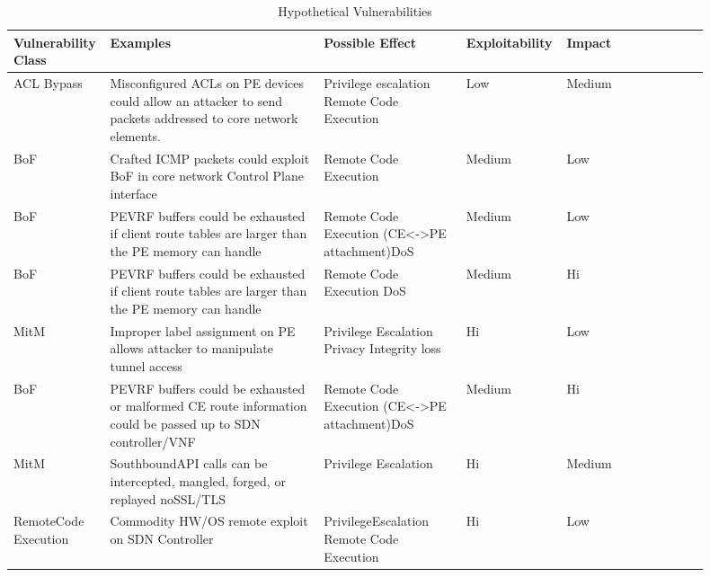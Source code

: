 \begin{table}[H]
\caption{Hypothetical Vulnerabilities}
\captionsetup{font=small,skip=0.25\baselineskip}
\footnotesize
\setlength\tabcolsep{5pt}
\begin{tabular}{p{0.1\linewidth}p{0.3\linewidth}p{0.2\linewidth}p{0.1\linewidth}p{0.1\linewidth}p{0.1\linewidth}}
\toprule
Vulnerability Class & Examples & Possible Effect & Exploitability & Impact \\ \midrule
ACL Bypass & Misconfigured ACLs on PE devices could allow an attacker to send packets addressed to core network elements. &  Privilege escalation Remote Code Execution & Low & Medium \\
BoF & Crafted ICMP packets could exploit BoF in core network Control Plane interface &  Remote Code Execution & Medium & Low \\
BoF & PEVRF  buffers could be exhausted if client route tables are larger than the PE memory can handle &  Remote Code Execution (CE\textless{}-\textgreater{}PE attachment)DoS & Medium & Low \\ \midrule
BoF & PEVRF buffers could be exhausted if client route tables are larger than the PE memory can handle & Remote Code Execution DoS & Medium & Hi\\
MitM & Improper label assignment on PE allows attacker to manipulate tunnel access &  Privilege Escalation Privacy Integrity loss & Hi & Low\\ 
\midrule
BoF & PEVRF  buffers could be exhausted or malformed CE route information could be passed up to SDN controller/VNF & Remote Code Execution (CE\textless{}-\textgreater{}PE attachment)DoS & Medium & Hi \\
MitM & SouthboundAPI calls can be intercepted, mangled, forged, or replayed noSSL/TLS & Privilege Escalation & Hi & Medium \\
RemoteCode Execution & Commodity HW/OS remote exploit on SDN Controller & PrivilegeEscalation Remote Code Execution & Hi & Low &  \\
\bottomrule
\end{tabular}%
\label{tab:hyp_vulns}
\end{table}




